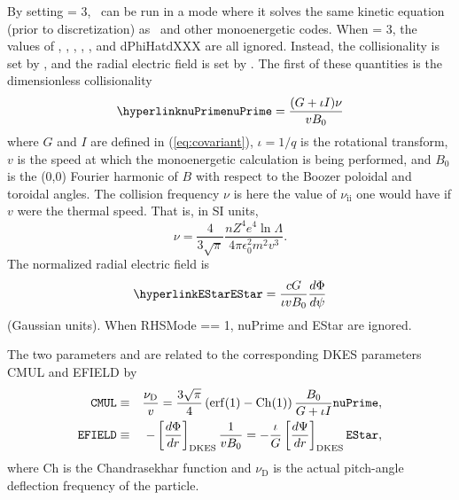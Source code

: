 By setting  = 3, \sfincs~can be run in a mode
where it solves the same kinetic equation (prior to discretization) as 
\dkes~and other monoenergetic codes.
When  = 3, the values of , , ,
, , and {\ttfamily dPhiHatdXXX} are all ignored.
Instead, the collisionality is set by , and the radial electric field is set
by .  The first of these quantities is the dimensionless collisionality
\begin{equation}
\mbox{\parlink{nuPrime}} = \frac{(G+\iota I) \nu}{v B_0}
\end{equation}
where $G$ and $I$ are defined in (\ref{eq:covariant}), $\iota=1/q$ is the rotational transform,
$v$ is the speed at which the monoenergetic calculation is being performed, and $B_0$ is the (0,0) Fourier harmonic of $B$
with respect to the Boozer poloidal and toroidal angles. The collision
frequency $\nu$ is here the value of $\nu_\mathrm{ii}$ one would have if
$v$ were the thermal speed. That is, in SI units,
\begin{equation}
  \nu=\frac{4}{3\sqrt{\pi}}\frac{n Z^4e^4\ln \Lambda}{4\pi\epsilon_0^2m^2v^3}.
\end{equation}
%
The normalized radial electric field is
\begin{equation}
\mbox{\parlink{EStar}} = \frac{cG}{\iota v B_0} \frac{d\Phi}{d\psi}
\end{equation}
(Gaussian units).
When {\ttfamily RHSMode} == 1, {\ttfamily nuPrime} and {\ttfamily EStar} are ignored.

The two parameters  and  are
related to the corresponding DKES parameters {\ttfamily CMUL} and
{\ttfamily EFIELD} by
\begin{eqnarray}
  \mbox{\ttfamily
    CMUL}&\equiv&\frac{\nu_\mathrm{D}}{v}=\frac{3\sqrt{\pi}}{4}\left(\mathrm{erf}(1)-\mathrm{Ch}(1)\right)
  \frac{B_0}{G+\iota I}\mbox{\ttfamily nuPrime},\\
  \mbox{\ttfamily EFIELD}&\equiv&-\left[\frac{d\Phi}{dr}\right]_\mathrm{DKES}\frac{1}{vB_0}=-\frac{\iota}{G}\left[\frac{d\Psi}{dr}\right]_\mathrm{DKES}\mbox{\ttfamily EStar},
\end{eqnarray}
where $\mathrm{Ch}$ is the Chandrasekhar function and $\nu_\mathrm{D}$
is the actual pitch-angle deflection frequency of the particle.

